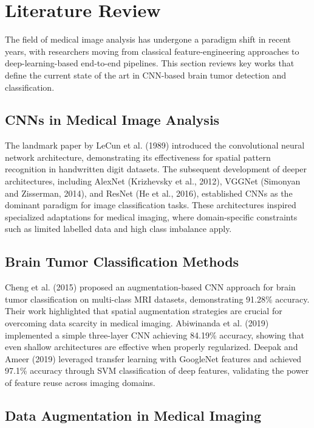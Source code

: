 \documentclass[12pt,a4paper]{article}
\begin{document}
\newpage

\section{Literature Review}

The field of medical image analysis has undergone a paradigm shift in recent years, with researchers moving from classical feature-engineering approaches to deep-learning-based end-to-end pipelines. This section reviews key works that define the current state of the art in CNN-based brain tumor detection and classification.

\subsection{CNNs in Medical Image Analysis}

The landmark paper by LeCun et al. (1989) introduced the convolutional neural network architecture, demonstrating its effectiveness for spatial pattern recognition in handwritten digit datasets. The subsequent development of deeper architectures, including AlexNet (Krizhevsky et al., 2012), VGGNet (Simonyan and Zisserman, 2014), and ResNet (He et al., 2016), established CNNs as the dominant paradigm for image classification tasks. These architectures inspired specialized adaptations for medical imaging, where domain-specific constraints such as limited labelled data and high class imbalance apply.

\subsection{Brain Tumor Classification Methods}

Cheng et al. (2015) proposed an augmentation-based CNN approach for brain tumor classification on multi-class MRI datasets, demonstrating 91.28\% accuracy. Their work highlighted that spatial augmentation strategies are crucial for overcoming data scarcity in medical imaging. Abiwinanda et al. (2019) implemented a simple three-layer CNN achieving 84.19\% accuracy, showing that even shallow architectures are effective when properly regularized. Deepak and Ameer (2019) leveraged transfer learning with GoogleNet features and achieved 97.1\% accuracy through SVM classification of deep features, validating the power of feature reuse across imaging domains.

\subsection{Data Augmentation in Medical Imaging}
\end{document}

